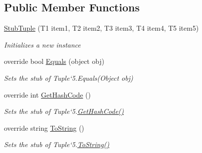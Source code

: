 \subsection*{Public Member Functions}
\begin{DoxyCompactItemize}
\item 
\hyperlink{class_system_1_1_fakes_1_1_stub_tuple_3_01_t1_00_01_t2_00_01_t3_00_01_t4_00_01_t5_01_4_a594b3f123071fd6c95b591f31468a9ca}{Stub\-Tuple} (T1 item1, T2 item2, T3 item3, T4 item4, T5 item5)
\begin{DoxyCompactList}\small\item\em Initializes a new instance\end{DoxyCompactList}\item 
override bool \hyperlink{class_system_1_1_fakes_1_1_stub_tuple_3_01_t1_00_01_t2_00_01_t3_00_01_t4_00_01_t5_01_4_ac8aff0b436028fb6223b4b8aead04859}{Equals} (object obj)
\begin{DoxyCompactList}\small\item\em Sets the stub of Tuple`5.Equals(\-Object obj)\end{DoxyCompactList}\item 
override int \hyperlink{class_system_1_1_fakes_1_1_stub_tuple_3_01_t1_00_01_t2_00_01_t3_00_01_t4_00_01_t5_01_4_a7ea8128580a3e411c8aaf986c04e2549}{Get\-Hash\-Code} ()
\begin{DoxyCompactList}\small\item\em Sets the stub of Tuple`5.\hyperlink{class_system_1_1_fakes_1_1_stub_tuple_3_01_t1_00_01_t2_00_01_t3_00_01_t4_00_01_t5_01_4_a7ea8128580a3e411c8aaf986c04e2549}{Get\-Hash\-Code()}\end{DoxyCompactList}\item 
override string \hyperlink{class_system_1_1_fakes_1_1_stub_tuple_3_01_t1_00_01_t2_00_01_t3_00_01_t4_00_01_t5_01_4_a7409cdfc9619fcf7bb19cabde917332d}{To\-String} ()
\begin{DoxyCompactList}\small\item\em Sets the stub of Tuple`5.\hyperlink{class_system_1_1_fakes_1_1_stub_tuple_3_01_t1_00_01_t2_00_01_t3_00_01_t4_00_01_t5_01_4_a7409cdfc9619fcf7bb19cabde917332d}{To\-String()}\end{DoxyCompactList}\end{DoxyCompactItemize}
